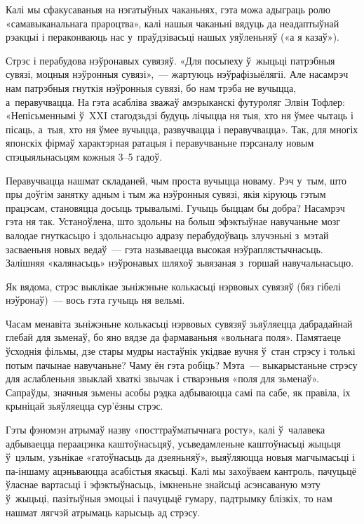 Калі мы сфакусаваныя на нэгатыўных чаканьнях, гэта можа адыграць ролю «самавыканальнага прароцтва», калі нашыя чаканьні вядуць да неадаптыўнай рэакцыі і пераконваюць нас у~праўдзівасьці нашых уяўленьняў («а я казаў»).

Стрэс і перабудова нэўронавых сувязяў. «Для посьпеху ў~жыцьці патрэбныя сувязі, моцныя нэўронныя сувязі»,~--- жартуюць нэўрафізыёлягіі. Але насамрэч нам патрэбныя гнуткія нэўронныя сувязі, бо нам трэба не вучыцца, а~перавучвацца. На гэта асабліва зважаў амэрыканскі футуроляг Элвін Тофлер: «Непісьменнымі ў~XXI стагодзьдзі будуць лічыцца ня тыя, хто ня ўмее чытаць і пісаць, а~тыя, хто ня ўмее вучыцца, развучвацца і перавучвацца». Так, для многіх японскіх фірмаў характэрная ратацыя і перавучваньне пэрсаналу новым спэцыяльнасьцям кожныя 3--5 гадоў.

Перавучвацца нашмат складаней, чым проста вучыцца новаму. Рэч у~тым, што пры доўгім занятку адным і тым жа нэўронныя сувязі, якія кіруюць гэтым працэсам, становяцца досыць трывалымі. Гучыць быццам бы добра? Насамрэч гэта ня так. Устаноўлена, што здольны на больш эфэктыўнае навучаньне мозг валодае гнуткасьцю і здольнасьцю адразу перабудоўваць злучэньні з~мэтай засваеньня новых ведаў~--- гэта называецца высокая нэўраплястычнасьць. Залішняя «калянасьць» нэўронавых шляхоў зьвязаная з~горшай навучальнасьцю.

Як вядома, стрэс выклікае зьніжэньне колькасьці нэрвовых сувязяў (бяз гібелі нэўронаў)~--- вось гэта гучыць ня вельмі.

Часам менавіта зьніжэньне колькасьці нэрвовых сувязяў зьяўляецца дабрадайнай глебай для зьменаў, бо яно вядзе да фармаваньня «вольнага поля». Памятаеце ўсходнія фільмы, дзе стары мудры настаўнік укідвае вучня ў~стан стрэсу і толькі потым пачынае навучаньне? Чаму ён гэта робіць? Мэта~--- выкарыстаньне стрэсу для аслабленьня звыклай хваткі звычак і стварэньня «поля для зьменаў». Сапраўды, значныя зьмены асобы рэдка адбываюцца самі па сабе, як правіла, іх крыніцай зьяўляецца сур'ёзны стрэс.

Гэты фэномэн атрымаў назву «посттраўматычнага росту», калі ў~чалавека адбываецца пераацэнка каштоўнасьцяў, усьведамленьне каштоўнасьці жыцьця ў~цэлым, узьнікае «гатоўнасьць да дзеяньняў», выяўляюцца новыя магчымасьці і па-іншаму ацэньваюцца асабістыя якасьці. Калі мы захоўваем кантроль, пачуцьцё ўласнае вартасьці і эфэктыўнасьць, імкненьне знайсьці асэнсаваную мэту ў~жыцьці, пазітыўныя эмоцыі і пачуцьцё гумару, падтрымку блізкіх, то нам нашмат лягчэй атрымаць карысьць ад стрэсу.

